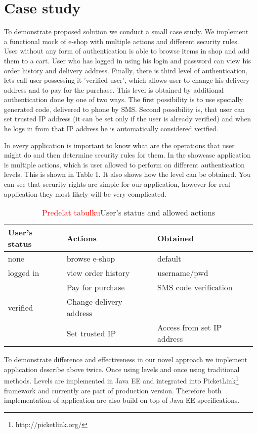 \documentclass{sig-alternate}
\newcommand\todo[1]{\textcolor{red}{#1}}
\begin{document}
\section{Case study}
To demonstrate proposed solution we conduct a small case study. We implement a functional mock of e-shop with multiple actions and different security rules. User without any form of authentication is able to browse items in shop and add them to a cart. User who has logged in using his login and password can view his order history and delivery address. Finally, there is third level of authentication, lets call user possessing it 'verified user', which allows user to change his delivery address and to pay for the purchase. This level is obtained by additional authentication done by one of two ways. The first possibility is to use specially generated code, delivered to phone by SMS. Second possibility is, that user can set trusted IP address (it can be set only if the user is already verified) and when he logs in from that IP address he is automatically considered verified.

In every application is important to know what are the operations that user might do and then determine security rules for them. In the showcase application is multiple actions, which is user allowed to perform on different authentication levels. This is shown in Table 1. It also shows how the level can be obtained. You can see that security rights are simple for our application, however for real application they most likely will be very complicated.

\begin{table}
\centering
\caption{\todo{Predelat tabulku}User's status and allowed actions}
\begin{tabular}{|m{2cm}|m{2.5cm}|m{3cm}|} \hline
User's status&Actions&Obtained\\ \hline
none & browse e-shop & default\\ \hline
logged in & view order \newline history & username/pwd\\ \hline
 &  Pay for purchase & SMS code verification \\ 
verified & Change delivery address &  \\ 
 & Set trusted IP & Access from set IP address\\ 
\hline\end{tabular}
\end{table}

To demonstrate difference and effectiveness in our novel approach we implement application describe above twice. Once using levels and once using traditional methods. Levels are implemented in Java EE and integrated into PicketLink\footnote{http://picketlink.org/} framework and currently are part of production version. Therefore both implementation of application are also build on top of Java EE specifications.
\end{document}
